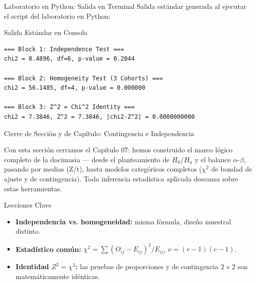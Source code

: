 \documentclass[10pt, aspectratio=169]{beamer}
\begin{document}
\begin{frame}[fragile]{Laboratorio en Python: Salida en Terminal}
  \scriptsize
  Salida estándar generada al ejecutar el script del laboratorio en Python:
  \vspace{0.02cm}
  \begin{block}{Salida Estándar en Consola}
    \fontsize{4pt}{5pt}\selectfont
    \begin{verbatim}
=== Block 1: Independence Test ===
chi2 = 8.4896, df=6, p-value = 0.2044

=== Block 2: Homogeneity Test (3 Cohorts) ===
chi2 = 56.1485, df=4, p-value = 0.000000

=== Block 3: Z^2 = Chi^2 Identity ===
chi2 = 7.3846, Z^2 = 7.3846, |chi2-Z^2| = 0.0000000000
    \end{verbatim}
  \end{block}
\end{frame}

\begin{frame}{Cierre de Sección y de Capítulo: Contingencia e Independencia}
  \begin{reflexion}
    Con esta sección cerramos el Capítulo 07: hemos construido el marco lógico completo de la docimasia --- desde el planteamiento de $H_0/H_a$ y el balance $\alpha$-$\beta$, pasando por medias (Z/t), hasta modelos categóricos completos ($\chi^2$ de bondad de ajuste y de contingencia). Toda inferencia estadística aplicada descansa sobre estas herramientas.
  \end{reflexion}

  \vspace{0.2cm}
  \pause
  \begin{block}{Lecciones Clave}
    \begin{itemize}\itemsep=0.08cm
      \item \textbf{Independencia vs. homogeneidad:} misma fórmula, diseño muestral distinto.
      \item \textbf{Estadístico común:} $\chi^2=\sum(O_{ij}-E_{ij})^2/E_{ij}$, $\nu=(r-1)(c-1)$.
      \item \textbf{Identidad $Z^2=\chi^2$:} las pruebas de proporciones y de contingencia $2\times2$ son matemáticamente idénticas.
    \end{itemize}
  \end{block}
\end{frame}
\end{document}
